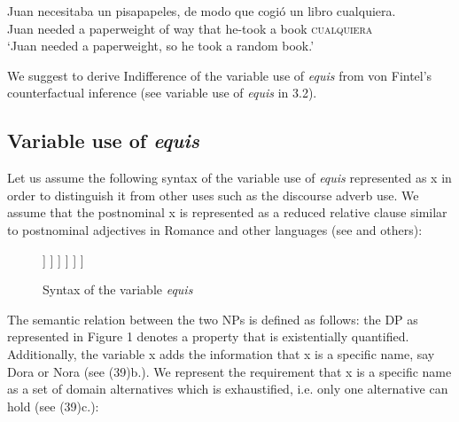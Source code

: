 \documentclass[output=paper
,modfonts
,nonflat]{langsci/langscibook}
\begin{document}
\ea 
\gll Juan necesitaba un pisapapeles, de modo que cogió un libro cualquiera.\\
Juan needed a paperweight of way that he-took a book \textsc{cualquiera}\\
\glt ‘Juan needed a paperweight, so he took a random book.’
\z

We suggest to derive Indifference of the variable use of \textit{equis} from von Fintel's counterfactual inference (see variable use of \textit{equis} in 3.2).

\subsection{Variable use of \textit{equis}}\label{sec:kellert:3.2}
Let us assume the following syntax of the variable use of \textit{equis} represented as x in order to distinguish it from other uses such as the discourse adverb use. We assume that the postnominal x is represented as a reduced relative clause similar to postnominal adjectives in Romance and other languages (see \citealt{Cinque2010} and others):


\begin{figure}
	\begin{forest}
		[DP
			[D\\\textit{un}\\`a'] [NP
				[NP\\\textit{nombre}\\`name'] [CP
					[C\\(\textit{que})\\`that'] [TP
						[T\\(\textit{es})\\`is'] [VP
							[~] [NP [$X$,roof]]
						]
					]
				]
			]
		]
	\end{forest}
	\caption{Syntax of the variable \textit{equis}\label{fig:kellert:tree1n}}
\end{figure}

The semantic relation between the two NPs is defined as follows: the DP as represented in Figure 1 denotes a property that is existentially quantified. Additionally, the variable x adds the information that x is a specific name, say Dora or Nora (see (39)b.). We represent the requirement that x is a specific name as a set of domain alternatives which is exhaustified, i.e. only one alternative can hold (see (39)c.): 
\end{document}

